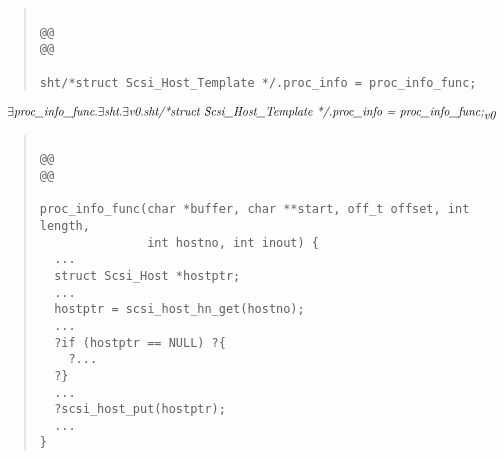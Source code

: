 \documentclass{article}
\newcommand{\mita}[1]{\mbox{\it{{#1}}}}
\begin{document}
\begin{quote}\begin{verbatim}

@@
@@

sht/*struct Scsi_Host_Template */.proc_info = proc_info_func;
\end{verbatim}\end{quote}

\[\begin{array}{l}
\exists \mita{proc\_info\_func} . \exists \mita{sht} . \exists \mita{v0} . \mita{sht/*struct Scsi\_Host\_Template */.proc\_info = proc\_info\_func;}_{\mita{v0}}
\end{array}\]

\begin{quote}\begin{verbatim}

@@
@@

proc_info_func(char *buffer, char **start, off_t offset, int length,
               int hostno, int inout) {
  ...
  struct Scsi_Host *hostptr;
  ...
  hostptr = scsi_host_hn_get(hostno);
  ...
  ?if (hostptr == NULL) ?{
    ?...
  ?}
  ...
  ?scsi_host_put(hostptr);
  ...
}
\end{verbatim}\end{quote}
\end{document}
